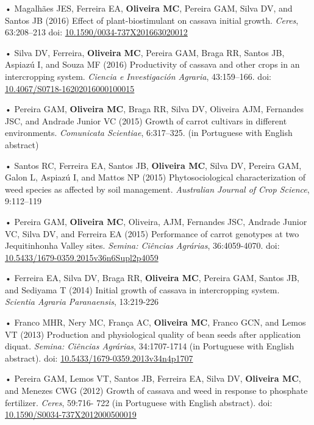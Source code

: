 \documentclass[11pt,]{article}
\begin{document}
• Magalhães JES, Ferreira EA, \textbf{Oliveira MC}, Pereira GAM, Silva
DV, and Santos JB (2016) Effect of plant-biostimulant on cassava initial
growth. \emph{Ceres}, 63:208--213 doi:
\href{http://www.scielo.br/scielo.php?script=sci_arttext\&pid=S0034-737X2016000200208}{10.1590/0034-737X201663020012}

• Silva DV, Ferreira, \textbf{Oliveira MC}, Pereira GAM, Braga RR,
Santos JB, Aspiazú I, and Souza MF (2016) Productivity of cassava and
other crops in an intercropping system. \emph{Ciencia e Investigación
Agraria}, 43:159--166. doi:
\href{https://scielo.conicyt.cl/scielo.php?script=sci_arttext\&pid=S0718-16202016000100015}{10.4067/S0718-16202016000100015}

• Pereira GAM, \textbf{Oliveira MC}, Braga RR, Silva DV, Oliveira AJM,
Fernandes JSC, and Andrade Junior VC (2015) Growth of carrot cultivars
in different environments. \emph{Comunicata Scientiae}, 6:317--325. (in
Portuguese with English abstract)

• Santos RC, Ferreira EA, Santos JB, \textbf{Oliveira MC}, Silva DV,
Pereira GAM, Galon L, Aspiazú I, and Mattos NP (2015) Phytosociological
characterization of weed species as affected by soil management.
\emph{Australian Journal of Crop Science}, 9:112--119

• Pereira GAM, \textbf{Oliveira MC}, Oliveira, AJM, Fernandes JSC,
Andrade Junior VC, Silva DV, and Ferreira EA (2015) Performance of
carrot genotypes at two Jequitinhonha Valley sites. \emph{Semina:
Ciências Agrárias}, 36:4059-4070. doi:
\href{http://www.uel.br/revistas/uel/index.php/semagrarias/article/view/17819}{10.5433/1679-0359.2015v36n6Supl2p4059}

• Ferreira EA, Silva DV, Braga RR, \textbf{Oliveira MC}, Pereira GAM,
Santos JB, and Sediyama T (2014) Initial growth of cassava in
intercropping system. \emph{Scientia Agraria Paranaensis}, 13:219-226

• Franco MHR, Nery MC, França AC, \textbf{Oliveira MC}, Franco GCN, and
Lemos VT (2013) Production and physiological quality of bean seeds after
application diquat. \emph{Semina: Ciências Agrárias}, 34:1707-1714 (in
Portuguese with English abstract). doi:
\href{http://www.uel.br/revistas/uel/index.php/semagrarias/article/view/10234}{10.5433/1679-0359.2013v34n4p1707}

• Pereira GAM, Lemos VT, Santos JB, Ferreira EA, Silva DV,
\textbf{Oliveira MC}, and Menezes CWG (2012) Growth of cassava and weed
in response to phosphate fertilizer. \emph{Ceres}, 59:716- 722 (in
Portuguese with English abstract). doi:
\href{http://www.scielo.br/scielo.php?script=sci_arttext\&pid=S0034-737X2012000500019}{10.1590/S0034-737X2012000500019}
\end{document}
